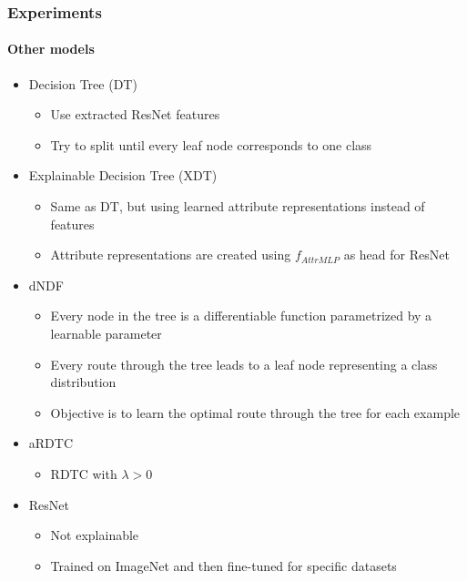 \documentclass[9pt]{beamer}
\begin{document}
\begin{frame}
\frametitle{Experiments}
\framesubtitle{Other models}
\begin{itemize}
	\item Decision Tree (DT)
	\begin{itemize}
		\item Use extracted ResNet features
		\item Try to split until every leaf node corresponds to one class
	\end{itemize}
	\item Explainable Decision Tree (XDT)
	\begin{itemize}
		\item Same as DT, but using learned attribute representations instead of features
		\item Attribute representations are created using $f_{AttrMLP}$ as head for ResNet
	\end{itemize}	
	\item dNDF \cite{kontschieder2015deep}
	\begin{itemize}
		\item Every node in the tree is a differentiable function parametrized by a learnable parameter
		\item Every route through the tree leads to a leaf node representing a class distribution
		\item Objective is to learn the optimal route through the tree for each example
	\end{itemize}
	\item aRDTC
	\begin{itemize}
		\item RDTC with $\lambda>0$
	\end{itemize}
		\item ResNet
	\begin{itemize}
		\item Not explainable
		\item Trained on ImageNet and then fine-tuned for specific datasets
	\end{itemize}
\end{itemize}
\end{frame}
\end{document}
